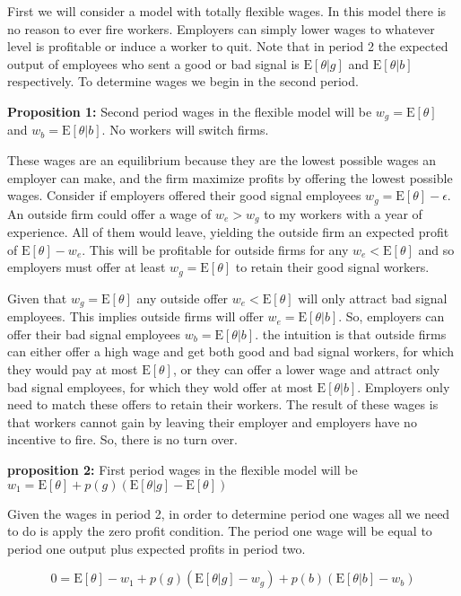 \documentclass[11pt]{article}
\newcommand{\E}{\mathrm{E}}
\begin{document}
First we will consider a model with totally flexible wages. In this model there is no reason to ever fire workers. Employers can simply lower wages to whatever level is profitable or induce a worker to quit. Note that in period 2 the expected output of employees who sent a good or bad signal is $\E[\theta|g]$ and $\E[\theta|b]$ respectively. To determine wages we begin in the second period. 

\textbf{Proposition 1:} Second period wages in the flexible model will be $w_g = \E[\theta]$ and $w_b = \E[\theta|b]$. No workers will switch firms.

These wages are an equilibrium because they are the lowest possible wages an employer can make, and the firm maximize profits by offering the lowest possible wages. Consider if employers offered their good signal employees $w_g = \E[\theta] - \epsilon$. An outside firm could offer a wage of $w_e > w_g$ to my workers with a year of experience. All of them would leave, yielding the outside firm an expected profit of $\E[\theta] - w_e $. This will be profitable for outside firms for any $w_e < \E[\theta]$ and so employers must offer at least $w_g = \E[\theta]$ to retain their good signal workers. \par 

Given that $w_g = \E[\theta]$ any outside offer $w_e < \E[\theta]$ will only attract bad signal employees. This implies outside firms will offer $w_e = \E[\theta|b]$. So, employers can offer their bad signal employees $w_b = \E[\theta|b]$. the intuition is that outside firms can either offer a high wage and get both good and bad signal workers, for which they would pay at most $\E[\theta]$, or they can offer a lower wage and attract only bad signal employees, for which they wold offer at most $\E[\theta|b]$. Employers only need to match these offers to retain their workers. The result of these wages is that workers cannot gain by leaving their employer and employers have no incentive to fire. So, there is no turn over. \par

\textbf{proposition 2:} First period wages in the flexible model will be $w_1 = \E[\theta] + p(g)(\E[\theta|g] - \E[\theta])$

Given the wages in period 2, in order to determine period one wages all we need to do is apply the zero profit condition. The period one wage will be equal to period one output plus expected profits in period two. 


$$0 = \E[\theta] - w_1 + p(g)(\E[\theta|g] - w_g) + p(b)(\E[\theta | b] - w_b) $$
	
\end{document}

